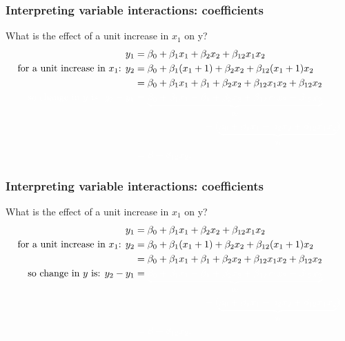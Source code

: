 \documentclass[aspectratio=169]{beamer}
\theoremstyle{principle}
\begin{document}
\begin{frame}
\frametitle{Interpreting variable interactions: coefficients}

What is the effect of a unit increase in $x_1$ on y?
\begin{align*}
y_1 &= \beta_0 + \beta_1x_1 + \beta_2x_2 + \beta_{12}x_1x_2\\
\mbox{for a unit increase in $x_1$: } y_2 &= \beta_0 + \beta_1(x_1 + 1) + \beta_2x_2 + \beta_{12}(x_1 + 1)x_2\\
&= \beta_0 + \beta_1x_1 + \beta_1 + \beta_2x_2 + \beta_{12}x_1x_2 + \beta_{12}x_2\\
\color{white}\mbox{so change in $y$ is: }y_2 - y_1 &\color{white}= \underbrace{\beta_0 + \beta_1x_1 + \beta_1 + \beta_2x_2 + \beta_{12}x_1x_2 + \beta_{12}x_2}_{y_2}\\
\color{white}&\color{white}\hspace{25mm} - (\underbrace{\beta_0 + \beta_1x_1 + \beta_2x_2 + \beta_{12}x_1x_2}_{y_1})\\
\color{white}&\color{white}= \beta + \beta_{12}x_2.
\end{align*}

\end{frame}

\begin{frame}
\frametitle{Interpreting variable interactions: coefficients}

What is the effect of a unit increase in $x_1$ on y?
\begin{align*}
y_1 &= \beta_0 + \beta_1x_1 + \beta_2x_2 + \beta_{12}x_1x_2\\
\mbox{for a unit increase in $x_1$: } y_2 &= \beta_0 + \beta_1(x_1 + 1) + \beta_2x_2 + \beta_{12}(x_1 + 1)x_2\\
&= \beta_0 + \beta_1x_1 + \beta_1 + \beta_2x_2 + \beta_{12}x_1x_2 + \beta_{12}x_2\\
\mbox{so change in $y$ is: }y_2 - y_1 &= \color{white}\underbrace{\beta_0 + \beta_1x_1 + \beta_1 + \beta_2x_2 + \beta_{12}x_1x_2 + \beta_{12}x_2}_{y_2}\\
\color{white}&\color{white}\hspace{25mm} - (\underbrace{\beta_0 + \beta_1x_1 + \beta_2x_2 + \beta_{12}x_1x_2}_{y_1})\\
\color{white}&\color{white}= \beta + \beta_{12}x_2.
\end{align*}

\end{frame}
\end{document}
